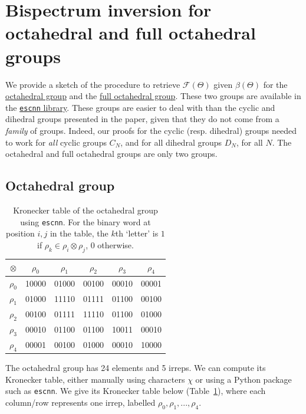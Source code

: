\documentclass{article}
\theoremstyle{plain}
\theoremstyle{definition}
\theoremstyle{remark}
\begin{document}
\section{Bispectrum inversion for octahedral and full octahedral groups}\label{app:octahedral}
We provide a sketch of the procedure to retrieve $\mathcal{F}(\Theta)$ given $\beta(\Theta)$ for the \href{https://en.wikipedia.org/wiki/Octahedral_symmetry}{octahedral group} and the \href{https://en.wikiversity.org/wiki/Full_octahedral_group}{full octahedral group}. These two groups are available in the \href{https://quva-lab.github.io/escnn/api/escnn.group.html}{\texttt{escnn} library}. These groups are easier to deal with than the cyclic and dihedral groups presented in the paper, given that they do not come from a \textit{family} of groups. Indeed, our proofs for the cyclic (resp. dihedral) groups needed to work for \textit{all} cyclic groups $C_N$, and for all dihedral groups $D_N$, for all $N$. The octahedral and full octahedral groups are only two groups.

\subsection{Octahedral group}
\begin{table}
        \centering
        \begin{tabular}{|c||c|c|c|c|c|}
            \hline
            $\otimes$ &$\rho_0$&$\rho_1$&$\rho_2$&$\rho_3$&$\rho_4$\\
            \hline
            \hline
            $\rho_0$&10000 & 01000 & 00100 & 00010 & 00001 \\
            \hline
            $\rho_1$&01000 & 11110 & 01111 & 01100 & 00100 \\
            \hline
            $\rho_2$&00100 & 01111 & 11110 & 01100 & 01000 \\
            \hline
            $\rho_3$&00010 & 01100 & 01100 & 10011 & 00010 \\
            \hline
            $\rho_4$ &00001 & 00100 & 01000 & 00010 & 10000 \\
            \hline
        \end{tabular}
        \caption{Kronecker table of the octahedral group using \texttt{escnn}. For the binary word at position $i,j$ in the table, the $k$th `letter' is $1$ if $\rho_k\in\rho_i\otimes \rho_j$, $0$ otherwise.}
        \label{tab:octa}
    \end{table}

The octahedral group has 24 elements and 5 irreps. We can compute its Kronecker table, either manually using characters $\chi$ or using a Python package such as \texttt{escnn}. We give its Kronecker table below (Table~\ref{tab:octa}), where each column/row represents one irrep, labelled $\rho_0, \rho_1, ..., \rho_4$.
\end{document}
